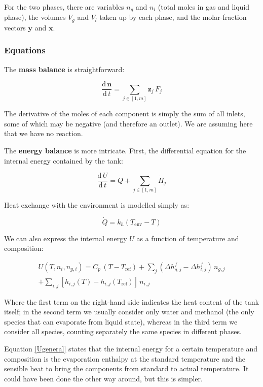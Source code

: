 \documentclass[a4paper]{article}
\renewcommand{\d}{\ensuremath{\mathrm{d}}}
\newcommand{\der}[2]{\ensuremath{\frac{\d \, #1}{\d \, #2}}}
\begin{document}
For the two phases, there are variables $n_g$ and $n_l$ (total moles in gas and
liquid phase), the volumes $V_g$ and $V_l$ taken up by each phase, and the
molar-fraction vectors $\mathbf{y}$ and $\mathbf{x}$.

\subsubsection{Equations}
The \textbf{mass balance} is straightforward:

\begin{equation}
\der{\mathbf{n}}{t} = \sum_{j \in [1, m]} \mathbf{z}_j\,F_j
\end{equation}

The derivative of the moles of each component is simply the sum of all inlets,
some of which may be negative (and therefore an outlet). We are assuming here
that we have no reaction.

The \textbf{energy balance} is more intricate. First, the differential equation
for the internal energy contained by the tank:

\begin{equation}
\label{firstlaw}
\der{U}{t} = \dot Q + \sum_{j \in [1, m]} \dot H_j
\end{equation}

Heat exchange with the environment is modelled simply as:

\begin{equation}
\dot Q = k_h ( T_\text{env} - T )
\end{equation}

We can also express the internal energy $U$ as a function of temperature and
composition:

\begin{multline}
\label{Ugeneral}
U(T, n_i, n_{g,i}) = C_p \, ( T - T_\text{ref} ) +
\sum_j \left (\Delta h _{g,j}^f - \Delta h _{l,j}^f \right) \, n_{g,j} \\
+ \sum_{i,j} [ h_{i,j}(T) - h_{i,j}(T_\text{ref})] \, n_{i,j}
\end{multline}


Where the first term on the right-hand side indicates the heat content of the
tank itself; in the second term we usually consider only water
and methanol (the only species that can evaporate from liquid state), whereas
in the third term we consider all species, counting separately the same species
in different phases.

Equation \ref{Ugeneral} states that the internal energy for a certain
temperature and composition is the evaporation enthalpy at the standard
temperature and the sensible heat to bring the components from standard to
actual temperature. It could have been done the other way around, but this is
simpler.
\end{document}
